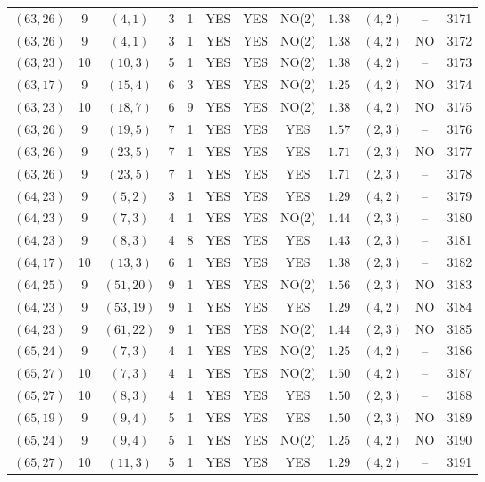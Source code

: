 \begin{longtable}{|c|c|c|c|c|c|c|c|c|c|c|c|}
$(63,26)$ & 9 & $(4,1)$ & 3 & 1 & YES & YES & NO(2) & $1.38$ & $(4,2)$ & -- & 3171\\
$(63,26)$ & 9 & $(4,1)$ & 3 & 1 & YES & YES & NO(2) & $1.38$ & $(4,2)$ & NO & 3172\\
$(63,23)$ & 10 & $(10,3)$ & 5 & 1 & YES & YES & NO(2) & $1.38$ & $(4,2)$ & -- & 3173\\
$(63,17)$ & 9 & $(15,4)$ & 6 & 3 & YES & YES & NO(2) & $1.25$ & $(4,2)$ & NO & 3174\\
$(63,23)$ & 10 & $(18,7)$ & 6 & 9 & YES & YES & NO(2) & $1.38$ & $(4,2)$ & NO & 3175\\
$(63,26)$ & 9 & $(19,5)$ & 7 & 1 & YES & YES & YES & $1.57$ & $(2,3)$ & -- & 3176\\
$(63,26)$ & 9 & $(23,5)$ & 7 & 1 & YES & YES & YES & $1.71$ & $(2,3)$ & NO & 3177\\
$(63,26)$ & 9 & $(23,5)$ & 7 & 1 & YES & YES & YES & $1.71$ & $(2,3)$ & -- & 3178\\
$(64,23)$ & 9 & $(5,2)$ & 3 & 1 & YES & YES & YES & $1.29$ & $(4,2)$ & -- & 3179\\
$(64,23)$ & 9 & $(7,3)$ & 4 & 1 & YES & YES & NO(2) & $1.44$ & $(2,3)$ & -- & 3180\\
$(64,23)$ & 9 & $(8,3)$ & 4 & 8 & YES & YES & YES & $1.43$ & $(2,3)$ & -- & 3181\\
$(64,17)$ & 10 & $(13,3)$ & 6 & 1 & YES & YES & YES & $1.38$ & $(2,3)$ & -- & 3182\\
$(64,25)$ & 9 & $(51,20)$ & 9 & 1 & YES & YES & NO(2) & $1.56$ & $(2,3)$ & NO & 3183\\
$(64,23)$ & 9 & $(53,19)$ & 9 & 1 & YES & YES & YES & $1.29$ & $(4,2)$ & NO & 3184\\
$(64,23)$ & 9 & $(61,22)$ & 9 & 1 & YES & YES & NO(2) & $1.44$ & $(2,3)$ & NO & 3185\\
$(65,24)$ & 9 & $(7,3)$ & 4 & 1 & YES & YES & NO(2) & $1.25$ & $(4,2)$ & -- & 3186\\
$(65,27)$ & 10 & $(7,3)$ & 4 & 1 & YES & YES & NO(2) & $1.50$ & $(4,2)$ & -- & 3187\\
$(65,27)$ & 10 & $(8,3)$ & 4 & 1 & YES & YES & YES & $1.50$ & $(2,3)$ & -- & 3188\\
$(65,19)$ & 9 & $(9,4)$ & 5 & 1 & YES & YES & YES & $1.50$ & $(2,3)$ & NO & 3189\\
$(65,24)$ & 9 & $(9,4)$ & 5 & 1 & YES & YES & NO(2) & $1.25$ & $(4,2)$ & NO & 3190\\
$(65,27)$ & 10 & $(11,3)$ & 5 & 1 & YES & YES & YES & $1.29$ & $(4,2)$ & -- & 3191\\

\end{longtable}
